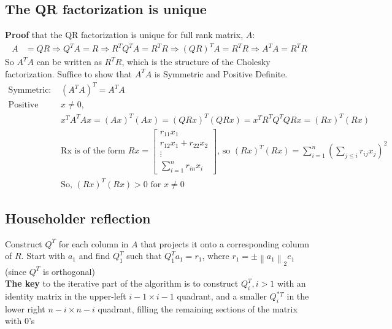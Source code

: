 \documentclass{article}
\newcommand{\norm}[2]{\left\lVert#1\right\rVert_#2}
\begin{document}
\begin{itemize}
{%
\subsection{The QR factorization is unique}
\textbf{Proof} that the QR factorization is unique for full rank matrix, $A$:
\begin{align*}
    A &= QR \Rightarrow Q^TA = R \Rightarrow R^TQ^TA = R^TR \Rightarrow (QR)^TA = R^TR \Rightarrow A^TA = R^TR
\end{align*}
So $A^TA$ can be written as $R^TR$, which is the structure of the Cholesky factorization. Suffice to show that $A^TA$ is Symmetric and Positive Definite. 
\begin{align*}
    \textrm{Symmetric: }& (A^TA)^T = A^TA\\
    \textrm{Positive definite: for }& x\neq 0,\\
    & x^TA^TAx = (Ax)^T(Ax) =(QRx)^T(QRx) = x^TR^TQ^TQRx =(Rx)^T(Rx)\\
    & \textrm{Rx is of the form } Rx = \begin{bmatrix} r_{11}x_1 \\ r_{12}x_1 + r_{22}x_2 \\ \vdots \\ \sum_{i=1}^n r_{in}x_i\end{bmatrix} \textrm{, so } (Rx)^T(Rx) = \sum_{i=1}^n (\sum_{j \leq i} r_{ij}x_j)^2\\
    &\textrm{So, } (Rx)^T(Rx) >0 \textrm{ for } x \neq 0
\end{align*}

\subsection{Householder reflection}
Construct $Q^T$ for each column in $A$ that projects it onto a corresponding column of $R$. Start with $a_1$ and find $Q_1^T$ such that $Q_1^Ta_1 = r_1$, where $r_1 = \pm \norm{a_1}{2}e_1$ (since $Q^T$ is orthogonal)\\
\noindent \textbf{The key} to the iterative part of the algorithm is to construct $Q_i^T, i > 1$ with an identity matrix in the upper-left $i-1 \times i-1$ quadrant, and a smaller $Q^*_i^T$ in the lower right $n-i \times n-i$ quadrant, filling the remaining sections of the matrix with $0$'s

}
\end{itemize}
\end{document}
